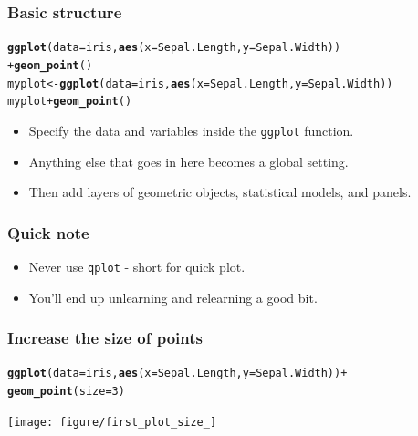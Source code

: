 \documentclass{beamer}\usepackage[]{graphicx}\usepackage[]{color}
\makeatletter
\newcommand{\hlkwd}[1]{\textcolor[rgb]{0.737,0.353,0.396}{\textbf{#1}}}%
\newenvironment{kframe}{%
 \def\at@end@of@kframe{}%
 \ifinner\ifhmode%
  \def\at@end@of@kframe{\end{minipage}}%
  \begin{minipage}{\columnwidth}%
 \fi\fi%
 \def\FrameCommand##1{\hskip\@totalleftmargin \hskip-\fboxsep
 \colorbox{shadecolor}{##1}\hskip-\fboxsep
     \hskip-\linewidth \hskip-\@totalleftmargin \hskip\columnwidth}%
 \MakeFramed {\advance\hsize-\width
   \@totalleftmargin\z@ \linewidth\hsize
   \@setminipage}}%
 {\par\unskip\endMakeFramed%
 \at@end@of@kframe}
\newenvironment{knitrout}{}{} %
\makeatother
\begin{document}

\begin{frame}[fragile]
\frametitle{Basic structure}
\begin{knitrout}\footnotesize
{}\color{fgcolor}\begin{kframe}
\begin{alltt}
\hlkwd{ggplot}(data = iris, \hlkwd{aes}(x = Sepal.Length, y = Sepal.Width))
 + \hlkwd{geom_point}()
myplot <- \hlkwd{ggplot}(data = iris, \hlkwd{aes}(x = Sepal.Length, y = Sepal.Width))
myplot + \hlkwd{geom_point}()
\end{alltt}
\end{kframe}
\end{knitrout}

\begin{itemize}
\item Specify the data and variables inside the \texttt{ggplot} function.
\item Anything else that goes in here becomes a global setting.
\item Then add layers of geometric objects, statistical models, and panels.
\end{itemize}
\end{frame}


\begin{frame}[fragile]
\frametitle{Quick note}
\begin{itemize}
\item Never use \texttt{qplot} - short for quick plot.
\item You'll end up unlearning and relearning a good bit.
\end{itemize}

\end{frame}



\begin{frame}[fragile]
\frametitle{Increase the size of points}
\begin{knitrout}\footnotesize
{}\color{fgcolor}\begin{kframe}
\begin{alltt}
\hlkwd{ggplot}(data = iris, \hlkwd{aes}(x = Sepal.Length, y = Sepal.Width)) +
\hlkwd{geom_point}(size = 3)
\end{alltt}
\end{kframe}

{\centering \texttt{[image: figure/first\_plot\_size\_]} 

}



\end{knitrout}

\end{frame}
\end{document}
